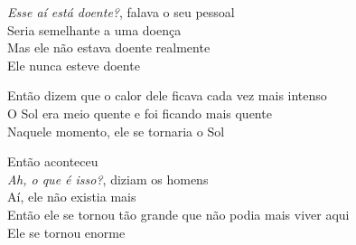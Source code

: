 \smallskip
\begin{center}\end{center}
\smallskip

\noindent \textit{Esse aí está doente?}, falava o seu pessoal\\
Seria semelhante a uma doença\\
Mas ele não estava doente realmente\\
Ele nunca esteve doente

\smallskip
\begin{center}\end{center}
\smallskip

\noindent Então dizem que o calor dele ficava cada vez mais intenso\\
O Sol era meio quente e foi ficando mais quente\\
Naquele momento, ele se tornaria o Sol

\smallskip
\begin{center}\end{center}
\smallskip

\noindent Então aconteceu\\
\textit{Ah, o que é isso?}, diziam os homens\\
Aí, ele não existia mais\\
Então ele se tornou tão grande que não podia mais viver aqui\\
Ele se tornou enorme

\smallskip
\begin{center}\end{center}
\smallskip

